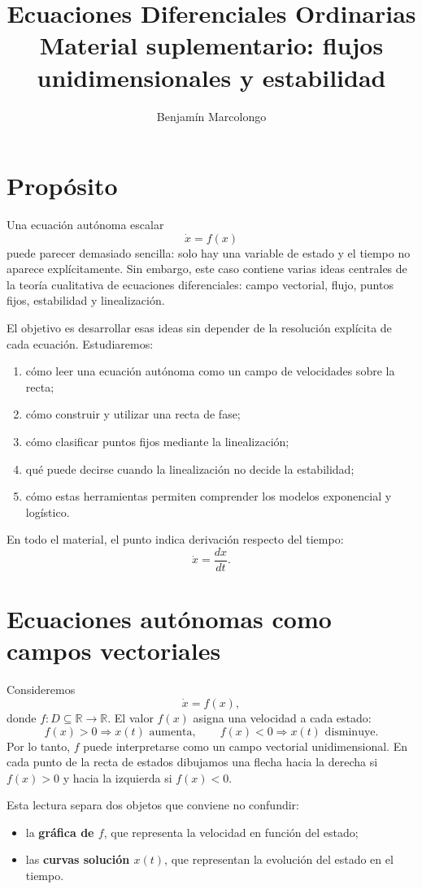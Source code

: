 \documentclass[12pt,a4paper]{article}
\title{Ecuaciones Diferenciales Ordinarias\\Material suplementario: flujos unidimensionales y estabilidad}
\author{Benjamín Marcolongo}
\date{}
\newcommand{\R}{\mathbb{R}}
\begin{document}
	\maketitle

	\section{Propósito}

	Una ecuación autónoma escalar
	\[
	\dot{x}=f(x)
	\]
puede parecer demasiado sencilla: solo hay una variable de estado y el tiempo no aparece explícitamente. Sin embargo, este caso contiene varias ideas centrales de la teoría cualitativa de ecuaciones diferenciales: campo vectorial, flujo, puntos fijos, estabilidad y linealización.

	El objetivo es desarrollar esas ideas sin depender de la resolución explícita de cada ecuación. Estudiaremos:
	\begin{enumerate}[label=\arabic*.]
		\item cómo leer una ecuación autónoma como un campo de velocidades sobre la recta;
		\item cómo construir y utilizar una recta de fase;
		\item cómo clasificar puntos fijos mediante la linealización;
		\item qué puede decirse cuando la linealización no decide la estabilidad;
		\item cómo estas herramientas permiten comprender los modelos exponencial y logístico.
	\end{enumerate}

	En todo el material, el punto indica derivación respecto del tiempo:
	\[
	\dot{x}=\frac{dx}{dt}.
	\]

	\clearpage
	\section{Ecuaciones autónomas como campos vectoriales}

	Consideremos
	\[
	\dot{x}=f(x),
	\]
donde \(f\colon D\subseteq\R\to\R\). El valor \(f(x)\) asigna una velocidad a cada estado:
	\[
	f(x)>0 \Longrightarrow x(t)\text{ aumenta},
	\qquad
	f(x)<0 \Longrightarrow x(t)\text{ disminuye}.
	\]
Por lo tanto, \(f\) puede interpretarse como un campo vectorial unidimensional. En cada punto de la recta de estados dibujamos una flecha hacia la derecha si \(f(x)>0\) y hacia la izquierda si \(f(x)<0\).

	Esta lectura separa dos objetos que conviene no confundir:
	\begin{itemize}[leftmargin=*]
		\item la \textbf{gráfica de \(f\)}, que representa la velocidad en función del estado;
		\item las \textbf{curvas solución \(x(t)\)}, que representan la evolución del estado en el tiempo.
	\end{itemize}
\end{document}
